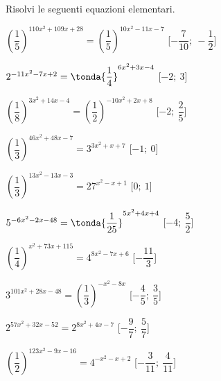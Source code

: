 \begin{esercizio}\label{ese:}
 Risolvi le seguenti equazioni elementari.
 \begin{enumeratea}
  \item  \(\left(\dfrac{1}{5}\right)^{110 x^2 +109 x +28} = 
           \left(\dfrac{1}{5}\right)^{10 x^2 -11 x -7}\)
   \hfill [\(-\dfrac{7}{10};~-\dfrac{1}{2}\)]
  \item  \(2^{-11 x^2 -7 x +2} = \tonda{\dfrac{1}{4}}^{6 x^2 +3 x -4}\)
   \hfill [\(-2;~3\)]
  \item  \(\left(\dfrac{1}{8}\right)^{3 x^2 +14 x -4} = 
           \left(\dfrac{1}{2}\right)^{-10 x^2 +2 x +8}\)
   \hfill [\(-2;~\dfrac{2}{5}\)]
  \item  \(\left(\dfrac{1}{3}\right)^{46 x^2 +48 x -7} = 3^{3 x^2 +x +7}\)
   \hfill [\(-1;~0\)]
  \item  \(\left(\dfrac{1}{3}\right)^{13 x^2 -13 x -3} = 27^{x^2 - x +1}\)
   \hfill [\(0;~1\)]
  \item  \(5^{-6 x^2 -2 x -48} = \tonda{\dfrac{1}{25}}^{5 x^2 +4 x +4}\)
   \hfill [\(-4;~\dfrac{5}{2}\)]
  \item  \(\left(\dfrac{1}{4}\right)^{x^2 +73 x +115} = 4^{8 x^2 -7 x +6}\)
   \hfill [\(-\dfrac{11}{3}\)]
  \item  \(3^{101 x^2 +28 x -48} = \left(\dfrac{1}{3}\right)^{-x^2 -8 x }\)
   \hfill [\(-\dfrac{4}{5};~\dfrac{3}{5}\)]
  \item  \(2^{57 x^2 +32 x -52} = 2^{8 x^2 +4 x -7}\)
   \hfill [\(-\dfrac{9}{7};~\dfrac{5}{7}\)]
  \item  \(\left(\dfrac{1}{2}\right)^{123 x^2 -9 x -16} = 4^{-x^2 - x +2}\)
   \hfill [\(-\dfrac{3}{11};~\dfrac{4}{11}\)]
 \end{enumeratea}
\end{esercizio}

